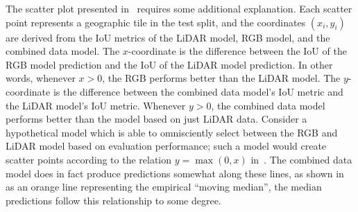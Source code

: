 The scatter plot presented in~ requires some additional explanation.
Each scatter point represents a geographic tile in the test split, and the coordinates $(x_i, y_i)$ are derived from the IoU metrics of the LiDAR model, RGB model, and the combined data model.
The $x$-coordinate is the difference between the IoU of the RGB model prediction and the IoU of the LiDAR model prediction.
In other words, whenever $x > 0$, the RGB performs better than the LiDAR model.
The $y$-coordinate is the difference between the combined data model's IoU metric and the LiDAR model's IoU metric.
Whenever $y > 0$, the combined data model performs better than the model based on just LiDAR data.
Consider a hypothetical model which is able to omnisciently select between the RGB and LiDAR model based on evaluation performance; such a model would create scatter points according to the relation $y = \max(0, x)$ in~.
The combined data model does in fact produce predictions somewhat along these lines, as shown in~ as an orange line representing the empirical \enquote{moving median}, the median predictions follow this relationship to some degree.
